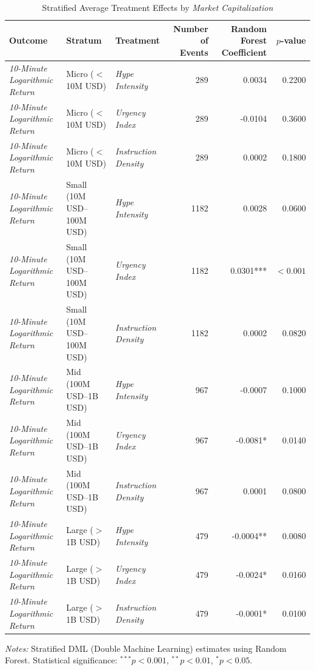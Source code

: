\begin{table}[htbp]
    \centering
    \caption{Stratified Average Treatment Effects by \textit{Market Capitalization}}
    \label{tab:stratified_ate}
    \small
    \begin{tabular}{l l l r r r}
    \toprule
    Outcome & Stratum & Treatment & Number of Events & Random Forest Coefficient & $p$-value \\
    \midrule
    \textit{10-Minute Logarithmic Return} & Micro ($<$10M USD) & \textit{Hype Intensity} & 289 & 0.0034 & 0.2200 \\
\textit{10-Minute Logarithmic Return} & Micro ($<$10M USD) & \textit{Urgency Index} & 289 & -0.0104 & 0.3600 \\
\textit{10-Minute Logarithmic Return} & Micro ($<$10M USD) & \textit{Instruction Density} & 289 & 0.0002 & 0.1800 \\
\textit{10-Minute Logarithmic Return} & Small (10M USD--100M USD) & \textit{Hype Intensity} & 1182 & 0.0028 & 0.0600 \\
\textit{10-Minute Logarithmic Return} & Small (10M USD--100M USD) & \textit{Urgency Index} & 1182 & 0.0301*** & $<0.001$ \\
\textit{10-Minute Logarithmic Return} & Small (10M USD--100M USD) & \textit{Instruction Density} & 1182 & 0.0002 & 0.0820 \\
\textit{10-Minute Logarithmic Return} & Mid (100M USD--1B USD) & \textit{Hype Intensity} & 967 & -0.0007 & 0.1000 \\
\textit{10-Minute Logarithmic Return} & Mid (100M USD--1B USD) & \textit{Urgency Index} & 967 & -0.0081* & 0.0140 \\
\textit{10-Minute Logarithmic Return} & Mid (100M USD--1B USD) & \textit{Instruction Density} & 967 & 0.0001 & 0.0800 \\
\textit{10-Minute Logarithmic Return} & Large ($>$1B USD) & \textit{Hype Intensity} & 479 & -0.0004** & 0.0080 \\
\textit{10-Minute Logarithmic Return} & Large ($>$1B USD) & \textit{Urgency Index} & 479 & -0.0024* & 0.0160 \\
\textit{10-Minute Logarithmic Return} & Large ($>$1B USD) & \textit{Instruction Density} & 479 & -0.0001* & 0.0100 \\
\bottomrule
    \end{tabular}
    \vspace{2mm}
    \footnotesize
    \textit{Notes:} Stratified DML (Double Machine Learning) estimates using Random Forest. 
    Statistical significance: $^{***}p<0.001$, $^{**}p<0.01$, $^{*}p<0.05$.
    \end{table}
    
